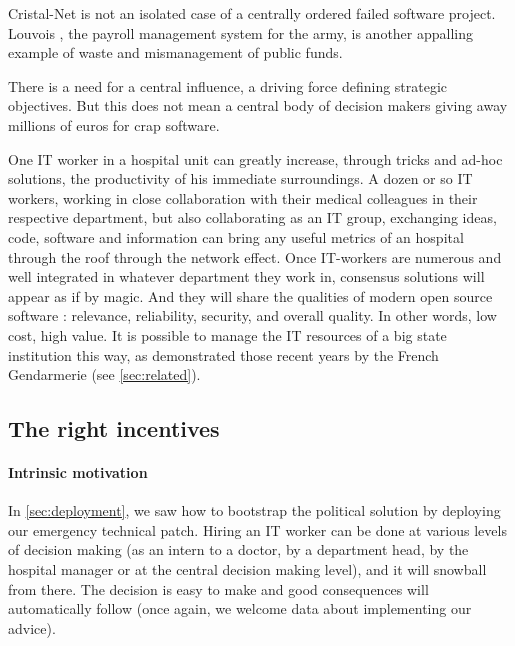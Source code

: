\documentclass[nobib]{tufte-handout}
\begin{document}
Cristal-Net is not an isolated case of a centrally ordered failed software project. Louvois \cite[in french]{louvois}, the payroll management system for the army, is another appalling example of waste and mismanagement of public funds.

There is a need for a central influence, a driving force defining strategic objectives. But this does not mean a central body of decision makers giving away millions of euros for crap software.

One IT worker in a hospital unit can greatly increase, through tricks and ad-hoc solutions, the productivity of his immediate surroundings. A dozen or so IT workers, working in close collaboration with their medical colleagues in their respective department, but also collaborating as an IT group, exchanging ideas, code, software and information can bring any useful metrics of an hospital through the roof through the network effect. Once IT-workers are numerous and well integrated in whatever department they work in, consensus solutions will appear as if by magic. And they will share the qualities of modern open source software : relevance, reliability, security, and overall quality. In other words, low cost, high value. It is possible to manage the IT resources of a big state institution this way, as demonstrated those recent years by the French Gendarmerie (see \autoref{sec:related}).

\subsection{The right incentives}
\label{sec:incentives}

\paragraph{Intrinsic motivation}

In \autoref{sec:deployment}, we saw how to bootstrap the political solution by deploying our emergency  technical patch. Hiring an IT worker can be done at various levels of decision making (as an intern to a doctor, by a department head, by the hospital manager or at the central decision making level), and it will snowball from there. The decision is easy to make and good consequences will automatically follow (once again, we welcome data about implementing our advice).
\end{document}
